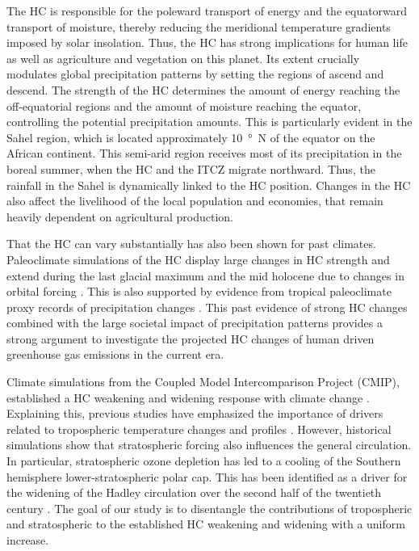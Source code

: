 The HC is responsible for the poleward transport of energy and the equatorward transport of moisture, thereby reducing the meridional temperature gradients imposed by solar insolation. Thus, the HC has strong implications for human life as well as agriculture and vegetation on this planet. Its extent crucially modulates global precipitation patterns by setting the regions of ascend and descend. The strength of the HC determines the amount of energy reaching the off-equatorial regions and the amount of moisture reaching the equator, controlling the potential precipitation amounts. This is particularly evident in the Sahel region, which is located approximately \SI{10}{\degree N} of the equator on the African continent. This semi-arid region receives most of its precipitation in the boreal summer, when the HC and the ITCZ migrate northward. Thus, the rainfall in the Sahel is dynamically linked to the HC position. Changes in the HC also affect the livelihood of the local population and economies, that remain heavily dependent on agricultural production.

That the HC can vary substantially has also been shown for past climates. Paleoclimate simulations of the HC display large changes in HC strength and extend during the last glacial maximum and the mid holocene due to changes in orbital forcing \parencite{dagostinoFactorsControllingHadley2017}. This is also supported by evidence from tropical paleoclimate proxy records of precipitation changes \parencite{mcgeeChangesITCZLocation2014b}.
This past evidence of strong HC changes combined with the large societal impact of precipitation patterns provides a strong argument to investigate the projected HC changes of human driven greenhouse gas emissions in the current era.



Climate simulations from the Coupled Model Intercomparison Project (CMIP), established a HC weakening and widening response with climate change \parencite{luExpansionHadleyCell2007,xiaComparisonTrendsHadley2020}. Explaining this, previous studies have emphasized the importance of drivers related to tropospheric temperature changes and profiles \parencite{chemkeElucidatingMechanismsResponsible2021,fanWeakeningTropicalCirculation2024}. However, historical simulations show that stratospheric forcing also influences the general circulation. In particular, stratospheric ozone depletion has led to a cooling of the Southern hemisphere lower-stratospheric polar cap. This has been identified as a driver for the widening of the Hadley circulation over the second half of the twentieth century \parencite{polvaniStratosphericOzoneDepletion2011}. The goal of our study is to disentangle the contributions of tropospheric and stratospheric \CO{} to the established HC weakening and widening with a uniform \CO{} increase.  

